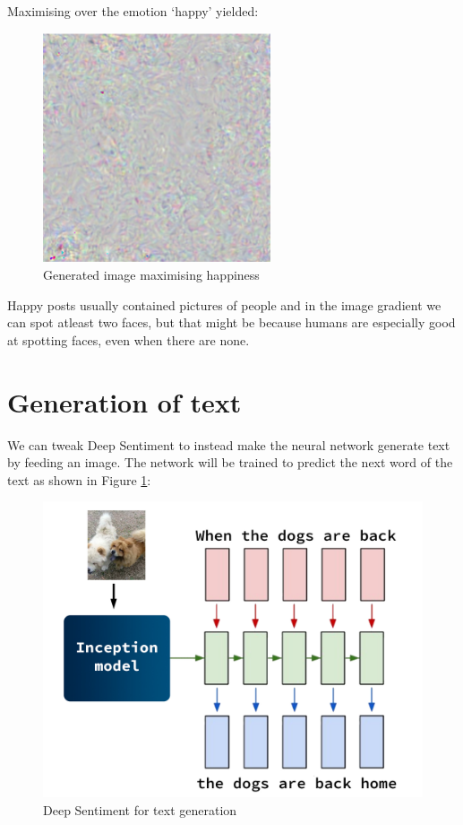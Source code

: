 Maximising over the emotion `happy' yielded:

\begin{figure}[H]
    \centering
    \includegraphics[width=0.6\textwidth]{Images/happy_gradient.png}
    \caption{Generated image maximising happiness}
\end{figure}

Happy posts usually contained pictures of people and in the image gradient we can spot atleast two faces, but that might be because humans are especially good at spotting faces, even when there are none.

\newpage
\section{Generation of text}

We can tweak Deep Sentiment to instead make the neural network generate text by feeding an image. The network will be trained to predict the next word of the text as shown in Figure \ref{deep-prediction}:

\begin{figure}[H]
    \centering
    \includegraphics[width=\textwidth]{Images/deep-prediction.jpg}
    \caption{Deep Sentiment for text generation}
    \label{deep-prediction}
\end{figure}

